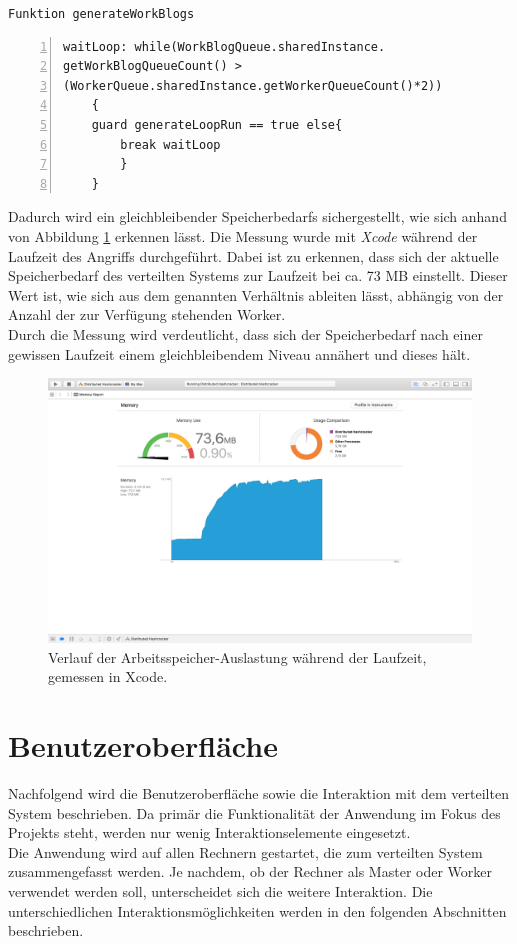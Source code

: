 \texttt{Funktion generateWorkBlogs}
\begin{lstlisting}[basicstyle=\ttfamily,numbers=left,numberstyle=\footnotesize\ttfamily,backgroundcolor=\color{sourcegray}]
waitLoop: while(WorkBlogQueue.sharedInstance.
getWorkBlogQueueCount() > 
(WorkerQueue.sharedInstance.getWorkerQueueCount()*2))
	{
	guard generateLoopRun == true else{ 
		break waitLoop
		}
	}
\end{lstlisting}

Dadurch wird ein gleichbleibender Speicherbedarfs sichergestellt, wie sich anhand von Abbildung \ref{fig:screenshot_ram} erkennen lässt. Die Messung wurde mit \emph{Xcode} während der Laufzeit des Angriffs durchgeführt. Dabei ist zu erkennen, dass sich der aktuelle Speicherbedarf des verteilten Systems zur Laufzeit bei ca. 73 MB einstellt. Dieser Wert ist, wie sich aus dem genannten Verhältnis ableiten lässt, abhängig von der Anzahl der zur Verfügung stehenden Worker. \\
Durch die Messung wird verdeutlicht, dass sich der Speicherbedarf nach einer gewissen Laufzeit einem gleichbleibendem Niveau annähert und dieses hält. 

\begin{figure}[!ht]
	\centering

		\includegraphics[natwidth=1200pt, natheight=349pt, width=1.0\textwidth]{images/screenshot_ram.png}
	\caption{Verlauf der Arbeitsspeicher-Auslastung während der Laufzeit, gemessen in Xcode.}
	\label{fig:screenshot_ram}
\end{figure}


\section{Benutzeroberfläche}
Nachfolgend wird die Benutzeroberfläche sowie die Interaktion mit dem verteilten System beschrieben. Da primär die Funktionalität der Anwendung im Fokus des Projekts steht, werden nur wenig Interaktionselemente eingesetzt. \\
Die Anwendung wird auf allen Rechnern gestartet, die zum verteilten System zusammengefasst werden. Je nachdem, ob der Rechner als Master oder Worker verwendet werden soll, unterscheidet sich die weitere Interaktion. Die unterschiedlichen Interaktionsmöglichkeiten werden in den folgenden Abschnitten beschrieben. 

